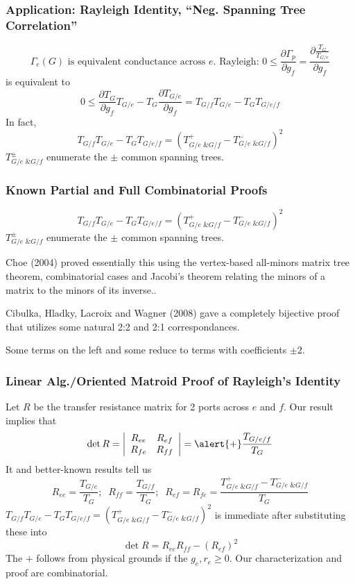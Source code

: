 \documentclass{beamer}
\begin{document}
\begin{frame}
\frametitle{Application: Rayleigh Identity, ``Neg. Spanning Tree Correlation''}
\[
\Gamma_e(G)\text{ is equivalent conductance across }e.
\text{ Rayleigh: }0 \le \frac{\partial \Gamma_{p}}{\partial g_f} =
\frac{\partial \frac{T_G}{T_{G/e}}}{\partial g_f}
\]
is equivalent to 
\[
0 \le \frac{\partial T_G}{\partial g_f}T_{G/e} - 
       T_G\frac{\partial T_{G/e}}{\partial g_f} 
=
T_{G/f}T_{G/e} - T_GT_{G/e/f}
\]
In fact,
\[
T_{G/f}T_{G/e} - T_GT_{G/e/f} = \left( T^+_{G/e \text{ \& } G/f} - T^-_{G/e \text{ \& } G/f} \right)^2
\]
$T^{\pm}_{G/e \text{ \& } G/f}$ enumerate the $\pm$ common spanning trees.


\end{frame}

\begin{frame}
\frametitle{Known Partial and Full Combinatorial Proofs}
\[
T_{G/f}T_{G/e} - T_GT_{G/e/f} = \left( T^+_{G/e \text{ \& } G/f} - T^-_{G/e \text{ \& } G/f} \right)^2
\]
$T^{\pm}_{G/e \text{ \& } G/f}$ enumerate the $\pm$ common spanning trees.

\vfill
Choe (2004) 
proved essentially this using the vertex-based all-minors matrix tree theorem,
combinatorial cases and Jacobi's theorem relating the minors of a matrix to
the minors of its inverse..

\vfill
Cibulka, Hladky, Lacroix and Wagner (2008) gave a completely bijective proof
that utilizes some natural 2:2 and 2:1 correspondances.

\vfill
{} Some terms on the left  and some
reduce to terms with coefficients $\pm 2$.
\vfill
\end{frame}



\begin{frame}
\frametitle{Linear Alg./Oriented Matroid Proof of Rayleigh's Identity}
Let $R$ be the transfer resistance matrix for 2 ports across $e$ and $f$.
Our result implies that
\[
\det R = \left|\begin{array}{cc} R_{ee} & R_{ef} \\ R_{fe} & R_{ff} \end{array}\right|
= \alert{+} \frac{T_{G/e/f}}{T_G}
\]
It and better-known results tell us
\[
R_{ee} = \frac{T_{G/e}}{T_G};\;\;R_{ff} = \frac{T_{G/f}}{T_G};\;\;
R_{ef}=R_{fe}=\frac{ T^+_{G/e \text{ \& } G/f} - T^-_{G/e \text{ \& } G/f} }{T_G}
\]
$T_{G/f}T_{G/e} - T_GT_{G/e/f} = \left( T^+_{G/e \text{ \& } G/f} - T^-_{G/e \text{ \& } G/f} \right)^2$
is immediate after substituting these into
\[
\det R = R_{ee}R_{ff}-(R_{ef})^2
\]
\alert{The $+$ follows from physical grounds if the $g_e, r_e \geq 0$.  Our
characterization and proof are combinatorial.}
\end{frame}
\end{document}
